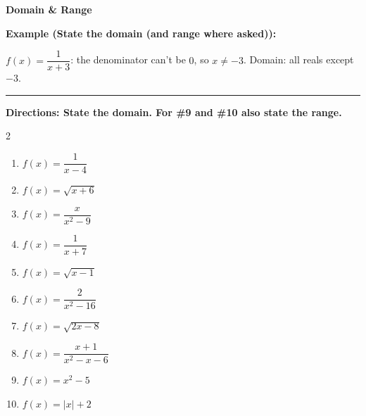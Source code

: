 \documentclass[12pt]{article}
\begin{document}
\vspace{0.35cm}

\begin{center}{\Large \textbf{Domain \& Range}}\end{center}\vspace{0.2cm}
\textbf{Example (State the domain (and range where asked)):}

$f(x)=\dfrac{1}{x+3}$: the denominator can't be $0$, so $x\ne -3$. Domain: all reals except $-3$.

\vspace{0.2cm}\hrule\vspace{0.35cm}
\textbf{Directions: State the domain. For \#9 and \#10 also state the range.}

\begin{multicols}{2}
\begin{enumerate}[label=\textbf{\arabic*.}, start=1, itemsep=2cm]
  \item $\displaystyle f(x)=\dfrac{1}{x-4}$
  \item $\displaystyle f(x)=\sqrt{x+6}$
  \item $\displaystyle f(x)=\dfrac{x}{x^{2}-9}$
  \item $\displaystyle f(x)=\dfrac{1}{x+7}$
  \item $\displaystyle f(x)=\sqrt{x-1}$
  \item $\displaystyle f(x)=\dfrac{2}{x^{2}-16}$
  \item $\displaystyle f(x)=\sqrt{2x-8}$
  \item $\displaystyle f(x)=\dfrac{x+1}{x^{2}-x-6}$
  \item $\displaystyle f(x)=x^{2}-5$
  \item $\displaystyle f(x)=|x|+2$
\end{enumerate}
\end{multicols}
\end{document}
